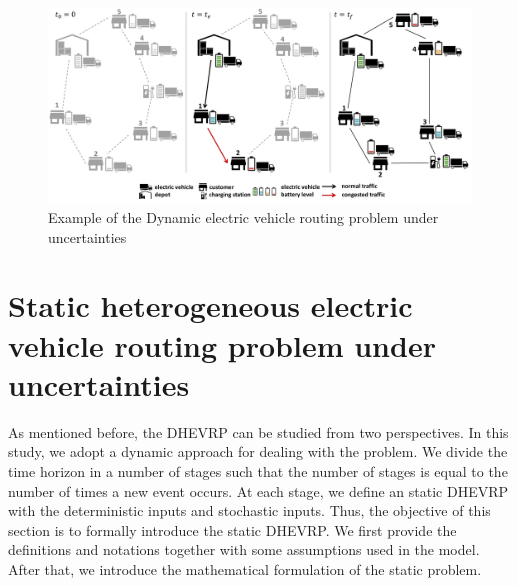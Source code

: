 \documentclass[11pt]{article}
\begin{document}
\begin{figure}[H]
\begin{centering}
  \includegraphics[width=1\linewidth]{Figure1.pdf}
    \caption{Example of the Dynamic electric vehicle routing problem under uncertainties}
     \label{Fig1}
     \end{centering}
\end{figure}

\section{Static heterogeneous electric vehicle routing problem under uncertainties}
\label{section:model}
As mentioned before, the DHEVRP can be studied from two perspectives. In this study, we adopt a dynamic approach for dealing with the problem. We divide the time horizon in a number of stages such that the number of stages is equal to the number of times a new event occurs. At each stage, we define an static DHEVRP with the deterministic inputs and stochastic inputs. Thus, the objective of this section is to formally introduce the static DHEVRP. We first provide the definitions and notations together with some assumptions used in the model. After that, we introduce the mathematical formulation of the static problem.

\end{document}
